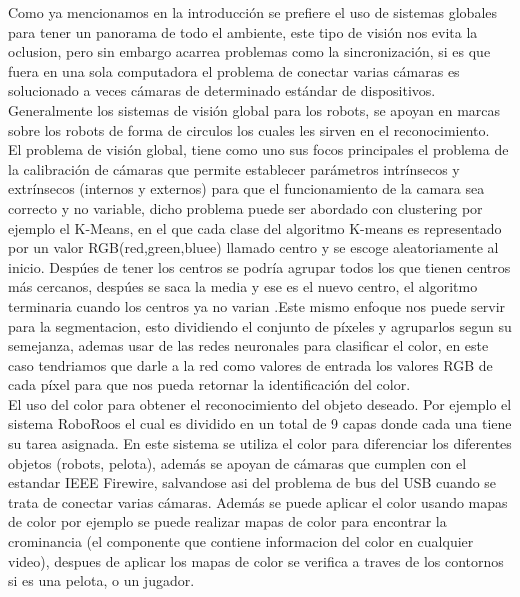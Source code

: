 Como ya mencionamos en la introducci\'on se prefiere el uso de sistemas globales para tener un panorama de todo el ambiente, este tipo de visi\'on nos evita la oclusion, pero sin embargo acarrea problemas como la sincronizaci\'on, si es que fuera en una sola computadora el problema de conectar varias c\'amaras es solucionado a veces c\'amaras de determinado est\'andar de dispositivos. Generalmente los sistemas de visi\'on global para los robots, se apoyan en marcas sobre los robots de forma de circulos los cuales les sirven  en el reconocimiento.\\
El problema de visi\'on global, tiene como uno sus focos principales el problema de la calibraci\'on de c\'amaras que permite establecer par\'ametros intr\'insecos y extr\'insecos (internos y externos) para que el funcionamiento de la camara sea correcto y no variable, dicho problema puede ser abordado con clustering por ejemplo el K-Means, en el que cada clase del algoritmo K-means es representado por un valor RGB(red,green,bluee) llamado centro  y se escoge aleatoriamente al inicio. Desp\'ues de tener los centros se podr\'ia agrupar  todos los que tienen centros m\'as cercanos, desp\'ues se saca la media y ese es el nuevo centro, el algoritmo terminaria cuando los centros ya no varian \cite{kelson_glo}.Este mismo enfoque nos puede servir para la segmentacion, esto dividiendo el conjunto de p\'ixeles y agruparlos segun su semejanza, ademas usar  de las redes neuronales para clasificar el color, en este caso tendriamos que darle a la red como valores de entrada los valores RGB de cada p\'ixel para que nos pueda retornar la identificaci\'on del color\cite{chabra_glo}.\\
El uso del color para obtener el reconocimiento del objeto deseado. Por ejemplo el sistema RoboRoos el cual es dividido en un total de 9 capas donde cada una tiene su tarea asignada. En este sistema se utiliza el color para diferenciar los diferentes objetos (robots, pelota), adem\'as se apoyan de c\'amaras que cumplen con el estandar IEEE Firewire, salvandose asi del problema de bus del USB cuando se trata de conectar varias c\'amaras\cite{ball_glo}. Adem\'as se puede aplicar el color usando mapas de color por ejemplo se puede realizar mapas de color para encontrar la crominancia (el componente que contiene informacion del color en cualquier video), despues de aplicar los mapas de color se verifica a traves de los contornos si es una pelota, o un jugador\cite{clau_glo}.
\\



